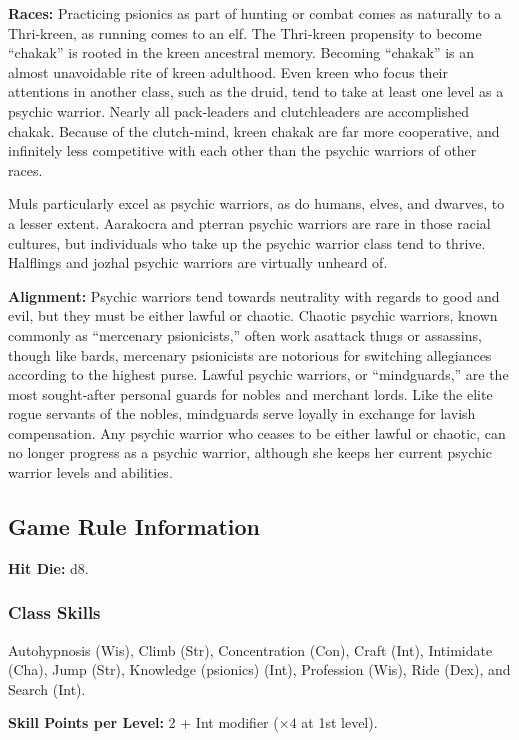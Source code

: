 \textbf{Races:} Practicing psionics as part of hunting or combat comes as naturally to a Thri‐kreen, as running comes to an elf. The Thri‐kreen propensity to become “chakak” is rooted in the kreen ancestral memory. Becoming “chakak” is an almost unavoidable rite of kreen adulthood. Even kreen who focus their attentions in another class, such as the druid, tend to take at least one level as a psychic warrior. Nearly all pack‐leaders and clutchleaders are accomplished chakak. Because of the clutch‐mind, kreen chakak are far more cooperative, and infinitely less competitive with each other than the psychic warriors of other races.

Muls particularly excel as psychic warriors, as do humans, elves, and dwarves, to a lesser extent. Aarakocra and pterran psychic warriors are rare in those racial cultures, but individuals who take up the psychic warrior class tend to thrive. Halflings and jozhal psychic warriors are virtually unheard of.

\textbf{Alignment:} Psychic warriors tend towards neutrality with regards to good and evil, but they must be either lawful or chaotic. Chaotic psychic warriors, known commonly as “mercenary psionicists,” often work asattack thugs or assassins, though like bards, mercenary psionicists are notorious for switching allegiances according to the highest purse. Lawful psychic warriors, or “mindguards,” are the most sought‐after personal guards for nobles and merchant lords. Like the elite rogue servants of the nobles, mindguards serve loyally in exchange for lavish compensation. Any psychic warrior who ceases to be either lawful or chaotic, can no longer progress as a psychic warrior, although she keeps her current psychic warrior levels and abilities.

\subsection{Game Rule Information}

\textbf{Hit Die:} d8.

\subsubsection{Class Skills}
Autohypnosis (Wis), Climb (Str), Concentration (Con), Craft (Int), Intimidate (Cha), Jump (Str), Knowledge (psionics) (Int), Profession (Wis), Ride (Dex), and Search (Int).

\textbf{Skill Points per Level:} 2 + Int modifier ($\times 4$ at 1st level).

